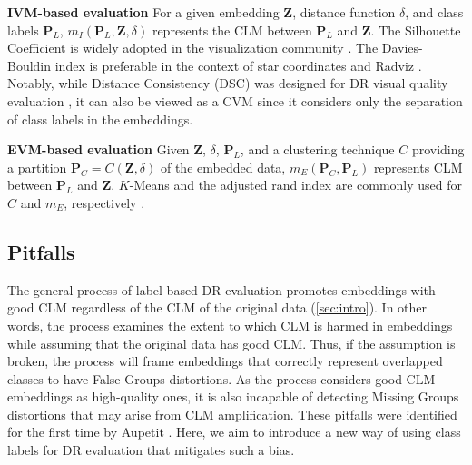 \noindent
\textbf{IVM-based evaluation }
For a given embedding $\mathbf{Z}$, distance function $\delta$, and class labels $\mathbf{P}_L$, $m_I(\mathbf{P}_L, \mathbf{Z}, \delta)$ represents the CLM between 
 $\mathbf{P}_L$ and $\mathbf{Z}$. 
The Silhouette Coefficient is widely adopted in the visualization community \cite{wang18tvcg, joia11lamp, loch15neurocomputing, xia22tvcg, etemadpour15ivapp}. 
The Davies-Bouldin index \cite{davies79tpami} is preferable in the context of star coordinates and Radviz \cite{angelini22tvcg, caro10pakdd}.
Notably, while Distance Consistency (DSC) \cite{sips09cgf} was designed for DR visual quality evaluation \cite{espadoto21tvcg, sedlmair12cgf, sedlmair15cgf}, it can also be viewed as a CVM since it considers only the separation of class labels in the embeddings.


\noindent
\textbf{EVM-based evaluation  }
Given $\mathbf{Z}$, $\delta$, $\mathbf{P}_{L}$, and a clustering technique $C$ providing a partition $\mathbf{P}_C = C(\mathbf{Z}, \delta)$ of the embedded data,
$m_E(\mathbf{P}_{C}, \mathbf{P}_L)$  represents CLM between $\mathbf{P}_L$ and $\mathbf{Z}$.
$K$-Means and the adjusted rand index are commonly used for $C$ and $m_E$, respectively \cite{zubaroglu20icbdr, xiang21fig, ji21jasa}. 



\subsection{Pitfalls}

\label{sec:cvmassumption}
The general process of label-based DR evaluation promotes embeddings with good CLM regardless of the CLM of the original data (\autoref{sec:intro}).
In other words, the process examines the extent to which CLM is harmed in embeddings while assuming that the original data has good CLM.
Thus, if the assumption is broken, the process will frame embeddings that correctly represent overlapped classes to have False Groups distortions. 
As the process considers good CLM embeddings as high-quality ones, it is also incapable of detecting Missing Groups distortions that may arise from CLM amplification. These pitfalls were identified for the first time by Aupetit \cite{aupetit14beliv}. 
Here, we aim to introduce a new way of using class labels for DR evaluation that mitigates such a bias. 


